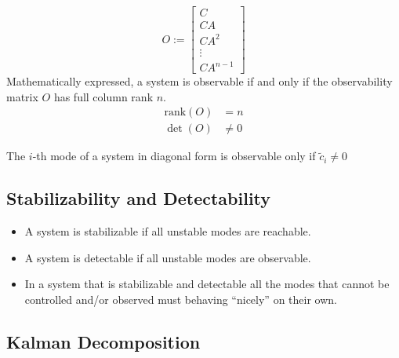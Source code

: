 \begin{equation*}
    O:= \begin{bmatrix}
        C      \\
        CA     \\
        CA^2   \\
        \vdots \\
        CA^{n-1}
    \end{bmatrix}
\end{equation*}
Mathematically expressed, a system is observable if and only if the observability matrix $O$ has full column rank $n$.
\begin{align*}
    \text{rank}(O) & = n    \\
    \det(O)        & \neq 0
\end{align*}


The $i$-th mode of a system in diagonal form is observable only if $\tilde{c}_i \neq 0$

\subsection{Stabilizability and Detectability}
\begin{itemize}
    \item A system is stabilizable if all unstable modes are reachable.
    \item A system is detectable if all unstable modes are observable.
    \item In a system that is stabilizable and detectable all the modes that cannot be controlled and/or observed must behaving ``nicely'' on their own.
\end{itemize}

\subsection{Kalman Decomposition}